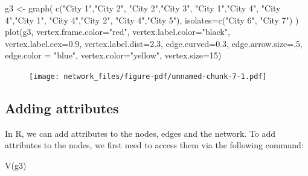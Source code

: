 \documentclass[
  letterpaper,
  DIV=11,
  numbers=noendperiod]{scrreprt}
\newenvironment{Shaded}{\begin{snugshade}}{\end{snugshade}}
\newcommand{\AttributeTok}[1]{\textcolor[rgb]{0.40,0.45,0.13}{#1}}
\newcommand{\DecValTok}[1]{\textcolor[rgb]{0.68,0.00,0.00}{#1}}
\newcommand{\FloatTok}[1]{\textcolor[rgb]{0.68,0.00,0.00}{#1}}
\newcommand{\FunctionTok}[1]{\textcolor[rgb]{0.28,0.35,0.67}{#1}}
\newcommand{\NormalTok}[1]{\textcolor[rgb]{0.00,0.23,0.31}{#1}}
\newcommand{\OtherTok}[1]{\textcolor[rgb]{0.00,0.23,0.31}{#1}}
\newcommand{\StringTok}[1]{\textcolor[rgb]{0.13,0.47,0.30}{#1}}
\begin{document}
\begin{Shaded}
\begin{Highlighting}[]
\NormalTok{g3 }\OtherTok{\textless{}{-}} \FunctionTok{graph}\NormalTok{( }\FunctionTok{c}\NormalTok{(}\StringTok{"City 1"}\NormalTok{,}\StringTok{"City 2"}\NormalTok{, }\StringTok{"City 2"}\NormalTok{,}\StringTok{"City 3"}\NormalTok{, }\StringTok{"City 1"}\NormalTok{,}\StringTok{"City 4"}\NormalTok{,  }\StringTok{"City 4"}\NormalTok{,}\StringTok{"City 1"}\NormalTok{,  }\StringTok{"City 4"}\NormalTok{,}\StringTok{"City 2"}\NormalTok{, }\StringTok{"City 4"}\NormalTok{,}\StringTok{"City 5"}\NormalTok{), }\AttributeTok{isolates=}\FunctionTok{c}\NormalTok{(}\StringTok{"City 6"}\NormalTok{, }\StringTok{"City 7"}\NormalTok{) ) }
\FunctionTok{plot}\NormalTok{(g3, }\AttributeTok{vertex.frame.color=}\StringTok{"red"}\NormalTok{,  }\AttributeTok{vertex.label.color=}\StringTok{"black"}\NormalTok{,}
\AttributeTok{vertex.label.cex=}\FloatTok{0.9}\NormalTok{, }\AttributeTok{vertex.label.dist=}\FloatTok{2.3}\NormalTok{, }\AttributeTok{edge.curved=}\FloatTok{0.3}\NormalTok{, }\AttributeTok{edge.arrow.size=}\NormalTok{.}\DecValTok{5}\NormalTok{, }\AttributeTok{edge.color =} \StringTok{"blue"}\NormalTok{, }\AttributeTok{vertex.color=}\StringTok{"yellow"}\NormalTok{, }\AttributeTok{vertex.size=}\DecValTok{15}\NormalTok{) }
\end{Highlighting}
\end{Shaded}

\begin{figure}[H]

{\centering \texttt{[image: network\_files/figure-pdf/unnamed-chunk-7-1.pdf]}

}

\end{figure}

\hypertarget{adding-attributes}{%
\subsection{Adding attributes}\label{adding-attributes}}

In R, we can add attributes to the nodes, edges and the network. To add
attributes to the nodes, we first need to access them via the following
command:

\begin{Shaded}
\begin{Highlighting}[]
\FunctionTok{V}\NormalTok{(g3)}
\end{Highlighting}
\end{Shaded}
\end{document}
